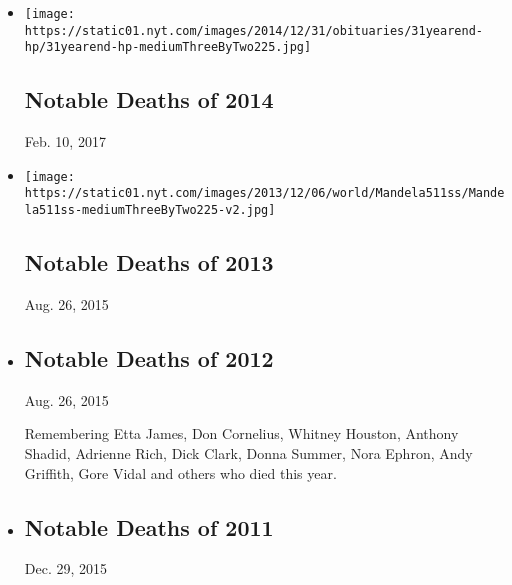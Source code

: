 \begin{itemize}
\item
  \href{https://www.nytimes.com/interactive/2014/obituaries/notable-deaths-2014.html}{}

  \texttt{[image: https://static01.nyt.com/images/2014/12/31/obituaries/31yearend-hp/31yearend-hp-mediumThreeByTwo225.jpg]}

  \hypertarget{notable-deaths-of-2014}{%
  \subsection{Notable Deaths of 2014}\label{notable-deaths-of-2014}}

  Feb. 10, 2017
\item
  \href{https://www.nytimes.com/interactive/obituaries/notable-deaths-of-2013.html}{}

  \texttt{[image: https://static01.nyt.com/images/2013/12/06/world/Mandela511ss/Mandela511ss-mediumThreeByTwo225-v2.jpg]}

  \hypertarget{notable-deaths-of-2013}{%
  \subsection{Notable Deaths of 2013}\label{notable-deaths-of-2013}}

  Aug. 26, 2015
\item
  \href{https://www.nytimes.com/interactive/obituaries/notable-deaths-of-2012.html}{}

  \hypertarget{notable-deaths-of-2012}{%
  \subsection{Notable Deaths of 2012}\label{notable-deaths-of-2012}}

  Aug. 26, 2015

  Remembering Etta James, Don Cornelius, Whitney Houston, Anthony
  Shadid, Adrienne Rich, Dick Clark, Donna Summer, Nora Ephron, Andy
  Griffith, Gore Vidal and others who died this year.
\item
  \href{https://www.nytimes.com/interactive/obituaries/2011_notabledeaths.html}{}

  \hypertarget{notable-deaths-of-2011}{%
  \subsection{Notable Deaths of 2011}\label{notable-deaths-of-2011}}

  Dec. 29, 2015


\end{itemize}
